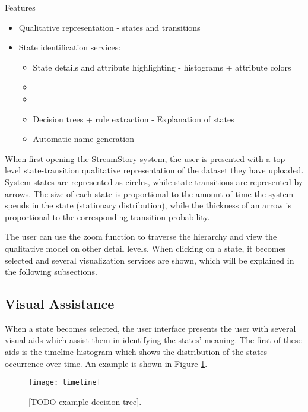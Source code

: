 Features  
\begin{itemize}
	\item Qualitative representation - states and transitions
	\item State identification services:
	\begin{itemize}
		\item State details and attribute highlighting - histograms + attribute colors
		\item {}
		\item {}
		\item Decision trees + rule extraction - Explanation of states
		\item Automatic name generation
	\end{itemize}
\end{itemize}

When first opening the StreamStory system, the user is presented with a top-level state-transition qualitative representation
of the dataset they have uploaded. System states are represented as circles, while state transitions are
represented by arrows. The size of each state is proportional to the amount of time the system spends in
the state (stationary distribution), while the thickness of an arrow is proportional to the corresponding
transition probability.

The user can use the zoom function to traverse the hierarchy and view the qualitative model on other 
detail levels. When clicking on a state, it becomes selected and several visualization services are
shown, which will be explained in the following subsections.

\subsection{Visual Assistance}

When a state becomes selected, the user interface presents the user with several visual aids which
assist them in identifying the states' meaning. The first of these aids is the timeline histogram
which shows the distribution of the states occurrence over time. An example is shown in Figure 
\ref{fig:time-hist}.

\begin{figure}[h!]
	\centering
	\texttt{[image: timeline]}
	\caption{[TODO example decision tree].}
	\label{fig:time-hist}
\end{figure}

